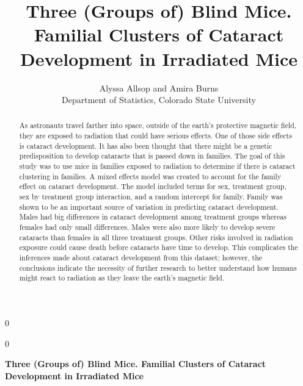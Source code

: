 \documentclass[12pt]{article}
\newcommand{\blind}{0}
\begin{document}
\def\spacingset#1{\renewcommand{\baselinestretch}%
{#1}\small\normalsize} \spacingset{1}



\blind
{
  \title{\bf Three (Groups of) Blind Mice. Familial Clusters of Cataract Development in Irradiated Mice}

  \author{
        Alyssa Allsop and Amira Burns \\
    Department of Statistics, Colorado State University\\
      }
  \maketitle
} \fi

\blind
{
  \bigskip
  \bigskip
  \bigskip
  \begin{center}
    {\LARGE\bf Three (Groups of) Blind Mice. Familial Clusters of Cataract Development in Irradiated Mice}
  \end{center}
  \medskip
} \fi

\bigskip
\begin{abstract}
As astronauts travel farther into space, outside of the earth's protective magnetic field, they are exposed to radiation that could have serious effects. One of those side effects is cataract development. It has also been thought that there might be a genetic predisposition to develop cataracts that is passed down in families. The goal of this study was to use mice in families exposed to radiation to determine if there is cataract clustering in families. A mixed effects model was created to account for the family effect on cataract development. The model included terms for sex, treatment group, sex by treatment group interaction, and a random intercept for family. Family was shown to be an important source of variation in predicting cataract development. Males had big differences in cataract development among treatment groups whereas females had only small differences. Males were also more likely to develop severe cataracts than females in all three treatment groups. Other risks involved in radiation exposure could cause death before cataracts have time to develop. This complicates the inferences made about cataract development from this dataset; however, the conclusions indicate the necessity of further research to better understand how humans might react to radiation as they leave the earth's magnetic field.
\end{abstract}
\end{document}
